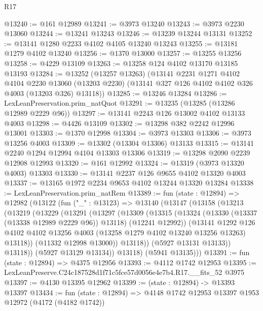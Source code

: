 \begin{lexlean}{R17}
\begin{coremodule}
@13240 := @161 @12989
@13241 := @3973 @13240
@13243 := @3973 @2230 @13060
@13244 := @13241 @13243
@13246 := @13239 @13244 @13131
@13252 := @13141 @1280 @2233 @4102 @4105 @13240 @13243
@13255 := @13181 @1279 @4102 @13240
@13256 := @1370 @13000
@13257 := @13255 @13256
@13258 := @4229 @13109
@13263 := @13258 @124 @4102 @13170 @13185 @13193
@13284 := @13252
    (@13257 @13263)
    (@13141
      @2231
      @1271
      @4102
      @4104
      @2230
      @13060
      (@13203 @2230)
      (@13141 @327 @126 @4102 @4102 @326 @4003 (@13203 @326) @13118))
@13285 := @13246 @13284
@13286 := LexLeanPreservation.prim_natQuot
@13291 := @13235 (@13285 (@13286 @12989 @2229 @96))
@13297 := @13141 @2243 @126 @13002 @4102 @13133 @4003
@13298 := @4426 @13109
@13302 := @13298 @382 @2242 @12996 @13001
@13303 := @1370 @12998
@13304 := @3973 @13303
@13306 := @3973 @13256 @4003
@13309 := @13302 (@13304 @13306) @13133
@13315 := @13141 @2240 @1294 @12994 @4104 @13303 @13306
@13319 := @13298 @2090 @2239 @12908 @12993
@13320 := @161 @12992
@13324 := @13319 (@3973 @13320 @4003) @13303
@13330 := @13141 @2237 @126 @9655 @4102 @13320 @4003
@13337 := @13165 @1972 @2234 @9653 @4102 @13244 @13320 @13284
@13338 := LexLeanPreservation.prim_natRem
@13389 := fun (state : @12894) =>
  @12982
    (@13122
      (fun ("_" : @13123) =>
      @13140
        (@13147
          (@13158
            (@13213
              (@13219
                (@13229
                  (@13291
                    (@13297
                      (@13309
                        (@13315
                          (@13324
                            (@13330 (@13337 (@13338 @12989 @2229 @96)) @13118)
                            (@12241 @12992))
                          (@13141
                            @1292
                            @126
                            @4102
                            @4102
                            @13256
                            @4003
                            (@13258 @1279 @4102 @13240 @13256 @13263)
                            @13118))
                        (@11332 @12998 @13000))
                      @13118))
                  (@5927 @13131 @13133))
                @13118))
            (@5927 @13129 @13134))
          @13118)
        (@5941 @13135)))
@13391 := fun (state : @12894) => @4375 @12956
@13393 := @4112 @1742 @12953
@13395 := LexLeanPreserve.C24c187528d1f71c5fce57d0056e4e7b4.R17.__fits_52 @3975
@13397 := @4130 @13395 @12962
@13399 := (state : @12894) -> @13393 @13397
@13434 := fun (state : @12894) =>
  @4148
    @1742
    @12953
    @13397
    @1953
    @12972
    (@4172 (@4182 @1742))

\end{coremodule}
\end{lexlean}
